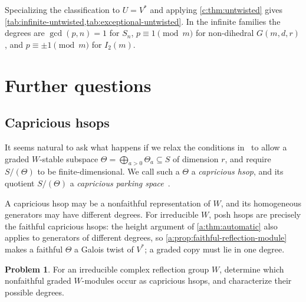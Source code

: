 \documentclass[10pt,a4paper]{amsart}
\newcommand{\defn}[1]{\emph{\color{darkblue}#1}}
\theoremstyle{definition}
\newtheorem{problem}[theorem]{Problem}
\begin{document}
Specializing the classification to $U=V^*$ and applying
\cref{c:thm:untwisted} gives
\cref{tab:infinite-untwisted,tab:exceptional-untwisted}. In the infinite
families the degrees are $\gcd(p,n)=1$ for $S_n$, $p\equiv1\pmod m$
for non-dihedral $G(m,d,r)$, and $p\equiv\pm1\pmod m$ for $I_2(m)$.


\section{Further questions}
\label{sec:questions}\label{sec:beyond-hsops}

\subsection{Capricious hsops}

It seems natural to ask what happens if we relax the conditions in~ to allow a graded $W$-stable subspace
$\Theta=\bigoplus_{a>0}\Theta_a\subseteq S$ of dimension $r$, and
require $S/(\Theta)$ to be finite-dimensional. We call such a $\Theta$ a
\defn{capricious hsop}, and its quotient $S/(\Theta)$ a
\defn{capricious parking space}~\cite[Section~6, p.~1274]{KonheimWeiss}.

A capricious hsop may be a nonfaithful representation of $W$, and its
homogeneous generators may have different degrees. For irreducible $W$, posh hsops are
precisely the faithful capricious hsops: the height argument of
\cref{a:thm:automatic} also applies to generators of different degrees,
so \cref{a:prop:faithful-reflection-module} makes a faithful $\Theta$
a Galois twist of $V^*$; a graded copy must lie in one degree.

\begin{problem}\label{prob:nonfaithful-hsops}
For an irreducible complex reflection group $W$, determine which
nonfaithful graded $W$-modules occur as capricious hsops,
and characterize their possible degrees.
\end{problem}

\end{document}
